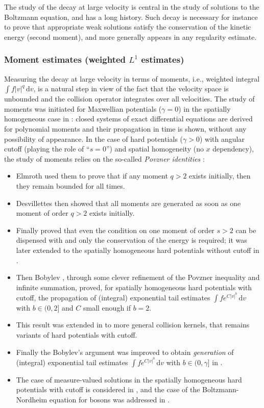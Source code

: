 \documentclass[11pt]{article}
\newcommand{\ie}{i.e.,\xspace}
\theoremstyle{plain}
\theoremstyle{definition}
\numberwithin{equation}{section}
\newcommand{\dd} {\, \mathrm{d}}
\begin{document}
The study of the decay at large velocity is central in the study of
solutions to the Boltzmann equation, and has a long history. Such
decay is necessary for instance to prove that appropriate weak
solutions satisfy the conservation of the kinetic energy (second
moment), and more generally appears in any regularity estimate.

\subsubsection{Moment estimates (weighted $L^1$ estimates)}
Measuring the decay at large velocity in terms of moments,
\ie weighted integral $\int f |v|^q \dd v$, is a natural step in view
of the fact that the velocity space is unbounded and the collision
operator integrates over all velocities. The study of moments was
initiated for Maxwellian potentials ($\gamma=0$) in the spatially
homogeneous case in \cite{MR0075725,MR0075726}: closed systems of
exact differential equations are derived for polynomial moments and
their propagation in time is shown, without any possibility of
appearance. In the case of hard potentials ($\gamma>0$) with angular
cutoff (playing the role of ``$s=0$'') and spatial homogeneity (no $x$
dependency), the study of moments relies on the so-called
\emph{Povzner identities} \cite{MR0142362}:
\begin{itemize}
\item Elmroth \cite{MR684411} used them to prove that if any moment $q>2$
exists initially, then they remain bounded
for all times.
\item Desvillettes \cite{MR1233644} then showed that all moments are
generated as soon as one moment of order $q>2$ exists initially.
\item Finally \cite{MR1697562,MR1716814} proved that even the
condition on one moment of order $s>2$ can be dispensed with and
only the conservation of the energy is required; it was later
extended to the spatially homogeneous hard potentials without cutoff
in \cite{MR1461113}.
\item Then Bobylev \cite{MR1478067}, through some clever refinement of
the Povzner inequality and infinite summation, proved, for
spatially homogeneous hard potentials with cutoff, the propagation
of (integral) exponential tail estimates $\int f e^{C|v|^b} \dd v$
with $b \in (0,2]$ and $C$ small enough if $b=2$.
\item This result was extended in \cite{MR2096050} to more general
collision kernels, that remains variants of hard potentials with cutoff.
\item Finally the Bobylev's argument was improved to obtain
\emph{generation} of (integral) exponential tail estimates
$\int f e^{C|v|^b}\dd v$ with $b \in (0,\gamma]$ in
\cite{MR2264623,MR3005550}.
\item The case of measure-valued solutions in the spatially
homogeneous hard potentials with cutoff is considered in
\cite{MR2871802}, and the case of the Boltzmann-Nordheim equation
for bosons was addressed in \cite{MR3493188}.
\end{itemize}
\end{document}
